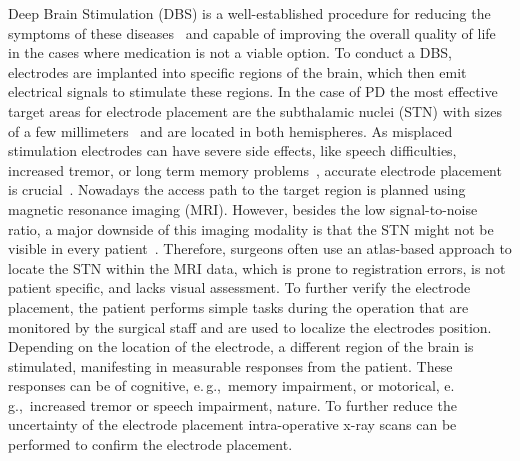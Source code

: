 \documentclass[review]{vgtc}                 %
\begin{document}
Deep Brain Stimulation (DBS) is a well-established procedure for reducing the symptoms of these diseases~\cite{Lindberg2002,Benabid2009} and capable of improving the overall quality of life in the cases where medication is not a viable option. To conduct a DBS, electrodes are implanted into specific regions of the brain, which then emit electrical signals to stimulate these regions. In the case of PD the most effective target areas for electrode placement are the subthalamic nuclei (STN) with sizes of a few millimeters~\cite{Richter2004} and are located in both hemispheres. As misplaced stimulation electrodes can have severe side effects, like speech difficulties, increased tremor, or long term memory problems~\cite{Astrom2010}, accurate electrode placement is crucial~\cite{Rodriguez-Oroz2005}. Nowadays the access path to the target region is planned using magnetic resonance imaging (MRI). However, besides the low signal-to-noise ratio, a major downside of this imaging modality is that the STN might not be visible in every patient~\cite{Starr2002}. Therefore, surgeons often use an atlas-based approach to locate the STN within the MRI data, which is prone to registration errors, is not patient specific, and lacks visual assessment. To further verify the electrode placement, the patient performs simple tasks during the operation that are monitored by the surgical staff and are used to localize the electrodes position. Depending on the location of the electrode, a different region of the brain is stimulated, manifesting in measurable responses from the patient. These responses can be of cognitive, e.\,g.,~memory impairment, or motorical, e.\,g.,~increased tremor or speech impairment, nature. To further reduce the uncertainty of the electrode placement intra-operative x-ray scans can be performed to confirm the electrode placement.
%
%
\end{document}
